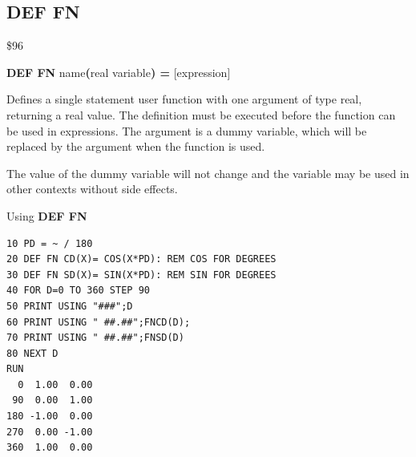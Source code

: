 \subsection{DEF FN}
\begin{description}[leftmargin=2cm,style=nextline]
\item [Token:] \$96
\item [Format:] {\bf DEF FN} name{\bf(}real variable{\bf) =} [expression]
\item [Usage:] Defines a single statement
               user function with one argument of type real,
               returning a real value.
               The definition must be executed before the function
               can be used in expressions. The argument is
               a dummy variable, which will be replaced by the
               argument when the function is used.

\item [Remarks:] The value of the dummy variable will not change
                 and the variable may be used in other contexts
                 without side effects.

\item [Example:] Using {\bf DEF FN}
\begin{tcolorbox}[colback=black,coltext=white]
\verbatimfont{\codefont}
\begin{verbatim}
10 PD = ~ / 180
20 DEF FN CD(X)= COS(X*PD): REM COS FOR DEGREES
30 DEF FN SD(X)= SIN(X*PD): REM SIN FOR DEGREES
40 FOR D=0 TO 360 STEP 90
50 PRINT USING "###";D
60 PRINT USING " ##.##";FNCD(D);
70 PRINT USING " ##.##";FNSD(D)
80 NEXT D
RUN
  0  1.00  0.00
 90  0.00  1.00
180 -1.00  0.00
270  0.00 -1.00
360  1.00  0.00
\end{verbatim}
\end{tcolorbox}
\end{description}


\newpage
